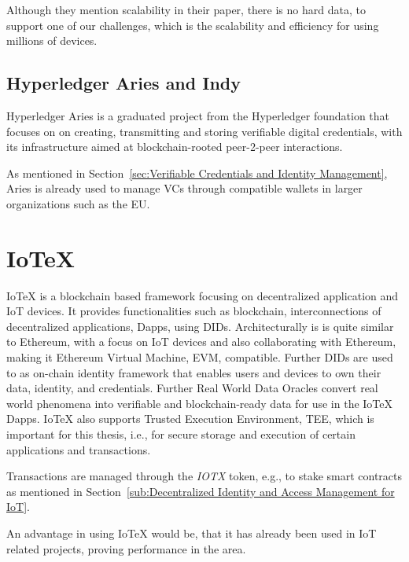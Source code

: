 Although they mention scalability in their paper, there is no hard data, to support one of our challenges, which is the
scalability and efficiency for using millions of devices.

\subsection{Hyperledger Aries and Indy} %
\label{sec:Hyperledger Aries}

Hyperledger Aries is a graduated project from the Hyperledger foundation that focuses on on creating, transmitting and
storing verifiable digital credentials, with its infrastructure aimed at blockchain-rooted peer-2-peer interactions.

As mentioned in Section~\ref{sec:Verifiable Credentials and Identity Management}, Aries is already used to manage VCs
through compatible wallets in larger organizations such as the EU.

\section{IoTeX} %
\label{sec:IoTeX}
IoTeX is a blockchain based framework focusing on decentralized application and IoT devices.
It provides functionalities such as blockchain, interconnections of decentralized applications, Dapps, using DIDs.
Architecturally is is quite similar to Ethereum, with a focus on IoT devices and also collaborating with Ethereum,
making it Ethereum Virtual Machine, EVM, compatible. Further DIDs are used to as on-chain identity framework that
enables users and devices to own their data, identity, and credentials. Further Real World Data Oracles convert real
world phenomena into verifiable and blockchain-ready data for use in the IoTeX Dapps.
IoTeX also supports Trusted Execution Environment, TEE, which is important for this thesis, i.e., for secure storage and
execution of certain applications and transactions.

Transactions are managed through the \textit{IOTX} token, e.g., to stake smart contracts as mentioned in
Section~\ref{sub:Decentralized Identity and Access Management for IoT}.

An advantage in using IoTeX would be, that it has already been used in IoT related projects, proving performance in the
area.

